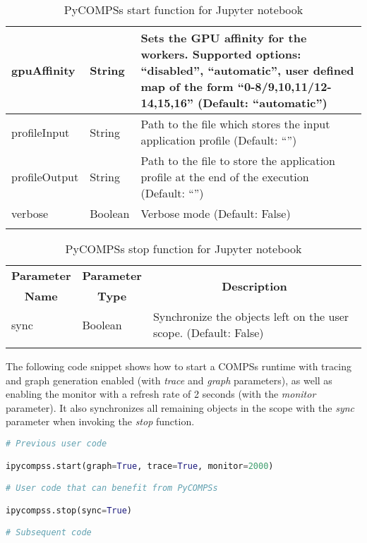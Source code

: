 \begin{longtable}{| p{} | p{} | p{} |}
    \hline
    gpuAffinity    & String  & \footnotesize{Sets the GPU affinity for the workers. Supported options: ``disabled'', ``automatic'', user defined map of the form ``0-8/9,10,11/12-14,15,16'' (Default: ``automatic'')} \\ 
    \hline
    profileInput   & String  & \footnotesize{Path to the file which stores the input application profile (Default: ``'')} \\ 
    \hline
    profileOutput  & String  & \footnotesize{Path to the file to store the application profile at the end of the execution (Default: ``'')} \\ 
    \hline
    verbose        & Boolean & \footnotesize{Verbose mode (Default: False)} \\ 
    \hline
    \caption{PyCOMPSs start function for Jupyter notebook}
    \label{tab:python_api_jupyter_start}
  \end{longtable}
\egroup

\bgroup
  \def\arraystretch{1.5}%
  \begin{longtable}{| p{} | p{} | p{} |}
    \hline
    \multicolumn{1}{|c|}{{\bf Parameter}} & \multicolumn{1}{c|}{{\bf Parameter}} & \multicolumn{1}{c|}{\multirow{2}{*}{{\bf Description}}}\\
    \multicolumn{1}{|c|}{{\bf Name}}      & \multicolumn{1}{c|}{{\bf Type}} & \\
    \hline
    sync           & Boolean & \footnotesize{Synchronize the objects left on the user scope. (Default: False)} \\
    \hline
    \caption{PyCOMPSs stop function for Jupyter notebook}
    \label{tab:python_api_jupyter_stop}
  \end{longtable}
\egroup

The following code snippet shows how to start a COMPSs runtime with tracing and graph generation enabled (with {\it trace} and {\it graph} parameters), as well as enabling the monitor with a refresh rate of 2 seconds (with the {\it monitor} parameter).
It also synchronizes all remaining objects in the scope with the {\it sync} parameter when invoking the {\it stop} function.

\begin{lstlisting}[language=python]
# Previous user code

ipycompss.start(graph=True, trace=True, monitor=2000)

# User code that can benefit from PyCOMPSs

ipycompss.stop(sync=True)

# Subsequent code
\end{lstlisting}

